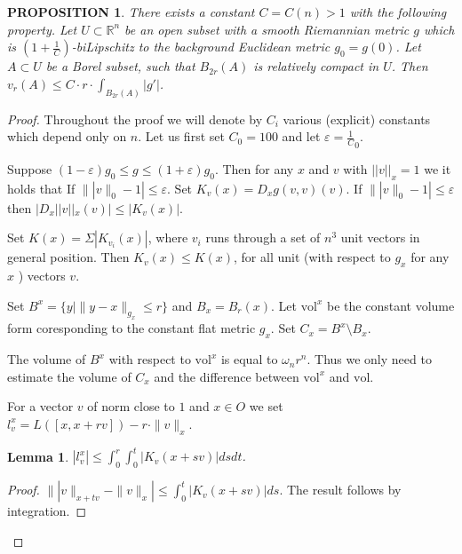 \documentclass[12pt,leqno]{amsart}
\numberwithin{equation}{section}
\newtheorem{lem}[thm]{Lemma}
\newtheorem{prop}[thm]{PROPOSITION}
\theoremstyle{definition}
\theoremstyle{remark}
\newcommand{\vol}{\mathrm{vol}}
\newcommand{\R}{\mathbb{R}}
\def\eps{\varepsilon}
\begin{document}
\begin{prop}\label{prop-smooth}
There exists a constant $C=C(n)>1$ with the following property.
Let $U\subset \R^n$ be an open subset with a smooth Riemannian
metric $g$ which is $(1+\frac 1 C)$-biLipschitz to  the background Euclidean metric $g_0=g(0)$.
  Let $A\subset U$ be a Borel subset, such that $B_{2r} (A)$ is relatively compact in $U$.
Then  $v_r (A) \leq C \cdot r \cdot \int _{B_{2r} ( A)} |g' |$.
\end{prop}



 \begin{proof}
%
%
Throughout the proof we will denote by $C_i$ various (explicit) constants which depend only on $n$.
Let us first set $C_0=100$ and let $\eps=\frac 1 C_0$. 


Suppose $(1-\eps)g_0\le g\le (1+\eps)g_0$.  Then for any $x$ and $v$ with $||v||_x=1$ we it holds that  If $\||v\|_0 -1| \leq \eps$.
 Set $K_v (x) = D_x g(v,v) (v)$.   If $\||v\|_0 -1| \leq \eps$  then
$|D_x||v||_x(v)|\le |K_v (x)| $.


 Set $K(x)= \Sigma |K_{v_i}(x)|$, where $v_i$ runs through a set of $n^3$ unit vectors in general position.
 Then $K_v(x) \leq K (x)$, for all unit (with respect to   $g_x$ for any $x$ ) vectors $v$.

 Set $B^x = \{ y | \|y-x\| _{g_x} \leq r \}$ and $B_x = B_r (x)$.  Let $\vol ^x$ be the constant
 volume form coresponding to the constant flat metric $g_x$.
   Set $C_x = B^x \setminus B_x$.

   The volume of $B^x$ with respect to $\vol ^x$ is equal to $\omega_n r^n$. Thus we only need to estimate
  the volume of $C_x$ and the difference between $\vol ^x$ and $\vol$.

 For a vector $v$ of norm close to $1$ and $x\in O$ we set
 $l_v ^x = L ([x,x+rv]) - r \cdot \| v\| _x$.

 \begin{lem}
 $|l_v ^x| \leq \int _0 ^r  \int _0 ^t | K_v (x+sv)| ds dt$.
 \end{lem}


 \begin{proof}
 $\||v\|_{x+tv} -\|v\| _x| \leq \int _0 ^t  |K_v (x+sv)| ds$. The result follows by integration.
  \end{proof}



\end{proof}
\end{document}
